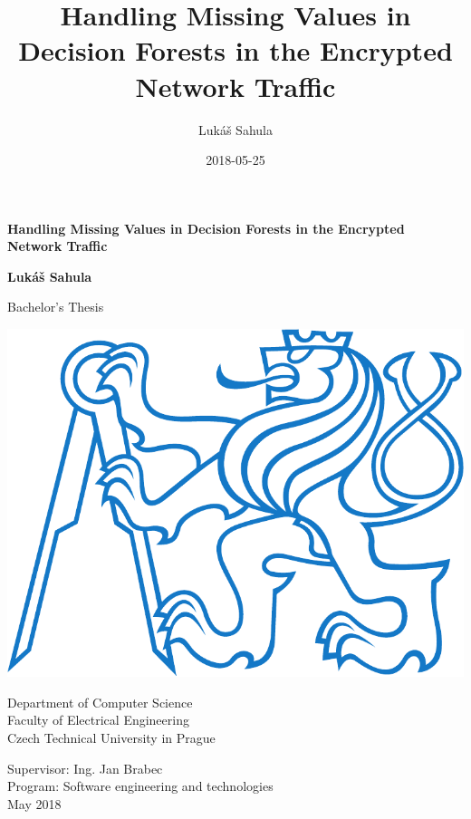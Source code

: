 \documentclass[11pt]{article}
\title{Handling Missing Values in Decision Forests in the Encrypted Network Traffic}
\date{2018-05-25}
\author{Lukáš Sahula}
\begin{document}
  \begin{titlepage}
    \begin{center}
      \vspace*{1cm}

      \textbf{Handling Missing Values in Decision Forests in the Encrypted Network Traffic}

      \vspace{0.5cm}

      \textbf{Lukáš Sahula}
      \vspace{0.5cm}

      Bachelor's Thesis \\

      \vspace{2cm}

      \includegraphics[scale=0.3]{thesis_res/ctu_logo_blue.pdf}

      \vspace{1cm}
      Department of Computer Science \\
      {\large Faculty of Electrical Engineering \\}
      {\LARGE Czech Technical University in Prague \\}

      \vspace{4.8cm}

    \end{center}

    \noindent Supervisor: Ing. Jan Brabec \\
    Program: Software engineering and technologies \\
    May 2018 \\
    
    
  \end{titlepage}
  \thispagestyle{empty}
  \newpage
  \thispagestyle{empty}
  \mbox{}
  \newpage
  
  \newpage
  \thispagestyle{empty}
  \mbox{}
  \newpage
\end{document}

